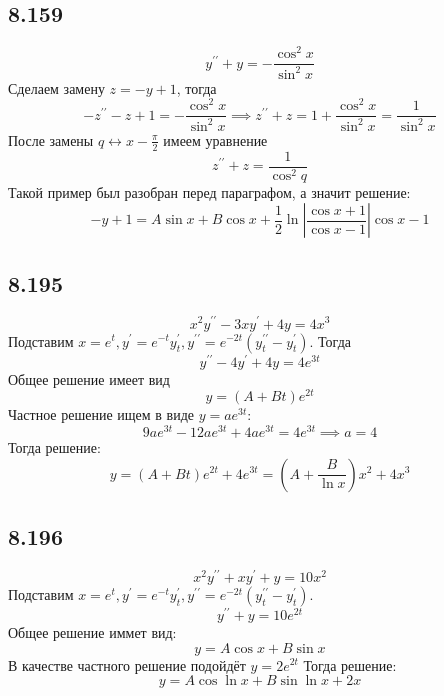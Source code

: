 \documentclass[12pt]{article}
\begin{document}
\subsection*{8.159}
\[
    y^{\prime\prime} + y = -\frac{\cos^2 x}{\sin^2 x}
\]
Сделаем замену $z = - y + 1$, тогда 
\[
    -z^{\prime\prime} - z + 1 = -\frac{\cos^2 x}{\sin^2 x} \implies z^{\prime\prime} + z = 1 + \frac{\cos^2 x}{\sin^2 x} = \frac{1}{\sin^2 x}
\] 
После замены $q \leftrightarrow x - \frac{\pi}{2}$ имеем уравнение 
\[
    z^{\prime\prime} + z = \frac{1}{\cos^2 q}
\] 
Такой пример был разобран перед параграфом, а значит решение: 
\[
    - y + 1 = A \sin x + B \cos x + \frac{1}{2} \ln \left\vert \frac{\cos x + 1}{\cos x -1} \right\vert \cos x - 1 
\]
\subsection*{8.195}
\[
    x^2 y^{\prime\prime} - 3xy^{\prime} + 4y = 4x^3
\]
Подставим $x = e^t, y^{\prime} = e^{-t} y^{\prime}_t, y^{\prime\prime} = e^{-2t} (y^{\prime\prime}_t - y^{\prime}_t)$. 
Тогда 
\[
    y^{\prime\prime} - 4y^{\prime} + 4y = 4e^{3t}
\] 
Общее решение имеет вид 
\[
    y = (A + Bt) e^{2t}
\]
Частное решение ищем в виде $y = a e^{3t}$: 
\[
    9a e^{3t} - 12 a e^{3t} + 4a e^{3t} = 4e^{3t} \implies 
    a = 4   
\]
Тогда решение: 
\[
    y = (A + Bt) e^{2t} + 4 e^{3t} = \left( A + \frac{B}{\ln x} \right) x^2 + 4x^3  
\]
\subsection*{8.196}
\[
    x^2 y^{\prime\prime} + xy^{\prime} + y = 10x^2
\]
Подставим $x = e^t, y^{\prime} = e^{-t} y^{\prime}_t, y^{\prime\prime} = e^{-2t} (y^{\prime\prime}_t - y^{\prime}_t)$. 
\[
    y^{\prime\prime} + y = 10 e^{2t} 
\]
Общее решение иммет вид: 
\[
    y = A \cos x + B \sin x
\]
В качестве частного решение подойдёт $y = 2 e^{2t}$
Тогда решение: 
\[
    y = A \cos \ln x + B \sin \ln x + 2 x
\] 
\end{document}
